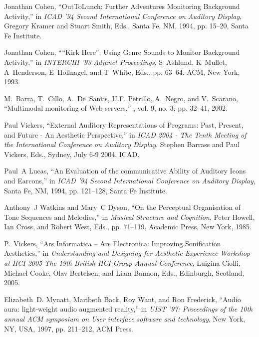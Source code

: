 \documentclass{article}
\begin{document}
\begin{thebibliography}{10}
Jonathan Cohen,
\newblock ``{O}ut{T}o{L}unch: Further Adventures Monitoring Background
  Activity,''
\newblock in {\em {ICAD} '94 Second International Conference on Auditory
  Display}, Gregory Kramer and Stuart Smith, Eds., Santa Fe, NM, 1994, pp.
  15--20, Santa Fe Institute.

Jonathan Cohen,
\newblock ````{K}irk {H}ere'': Using Genre Sounds to Monitor Background
  Activity,''
\newblock in {\em INTERCHI '93 Adjunct Proceedings}, S~Ashlund, K~Mullet,
  A~Henderson, E~Hollnagel, and T~White, Eds., pp. 63--64. ACM, New York, 1993.

M.~Barra, T.~Cillo, A.~De~Santis, U.F. Petrillo, A.~Negro, and V.~Scarano,
\newblock ``Multimodal monitoring of Web servers,''
, vol. 9, no. 3, pp. 32--41, 2002.

Paul Vickers,
\newblock ``External Auditory Representations of Programs: Past, Present, and
  Future - An Aesthetic Perspective,''
\newblock in {\em ICAD 2004 - The Tenth Meeting of the International Conference
  on Auditory Display}, Stephen Barrass and Paul Vickers, Eds., Sydney, July
  6-9 2004, ICAD.

Paul~A Lucas,
\newblock ``An Evaluation of the communicative Ability of Auditory Icons and
  Earcons,''
\newblock in {\em ICAD '94 Second International Conference on Auditory
  Display}, Santa Fe, NM, 1994, pp. 121--128, Santa Fe Institute.

Anthony~J Watkins and Mary~C Dyson,
\newblock ``On the Perceptual Organisation of Tone Sequences and Melodies,''
\newblock in {\em Musical Structure and Cognition}, Peter Howell, Ian Cross,
  and Robert West, Eds., pp. 71--119. Academic Press, New York, 1985.

P.~Vickers,
\newblock ``{Ars Informatica -- Ars Electronica: Improving Sonification
  Aesthetics},''
\newblock in {\em Understanding and Designing for Aesthetic Experience Workshop
  at HCI 2005 The 19th British HCI Group Annual Conference}, Luigina Ciolfi,
  Michael Cooke, Olav Bertelsen, and Liam Bannon, Eds., Edinburgh, Scotland,
  2005.

Elizabeth~D. Mynatt, Maribeth Back, Roy Want, and Ron Frederick,
\newblock ``Audio aura: light-weight audio augmented reality,''
\newblock in {\em UIST '97: Proceedings of the 10th annual ACM symposium on
  User interface software and technology}, New York, NY, USA, 1997, pp.
  211--212, ACM Press.


\end{thebibliography}
\end{document}
